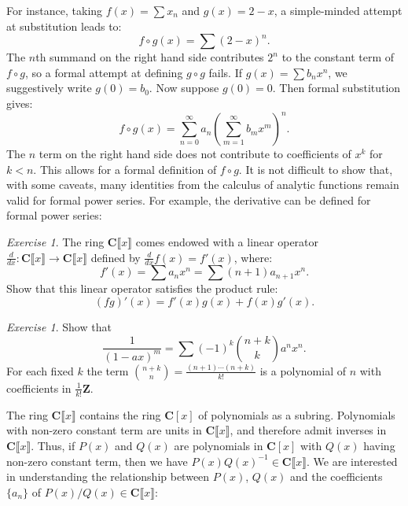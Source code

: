\documentclass{amsbook}
\newcommand{\ZZ}{\mathbf Z}
\newcommand{\CC}{\mathbf C}
\newcommand{\ps}[1]{\CC\llbracket#1\rrbracket}
\theoremstyle{definition}
\theoremstyle{remark}
\newtheorem{exercise}[theorem]{Exercise}
\begin{document}
For instance, taking $f(x)=\sum x_n$ and $g(x)=2-x$, a simple-minded attempt at substitution leads to:
\begin{displaymath}
  f\circ g(x) = \sum  (2-x)^n.
\end{displaymath}
The $n$th summand on the right hand side contributes $2^n$ to the constant term of $f\circ g$, so a formal attempt at defining $g\circ g$ fails.
If $g(x)=\sum b_nx^n$, we suggestively write $g(0)=b_0$.
Now suppose $g(0)=0$.
Then formal substitution gives:
\begin{displaymath}
  f\circ g(x) = \sum_{n=0}^\infty a_n\left(\sum_{m=1}^\infty b_mx^m\right)^n.
\end{displaymath}
The $n$ term on the right hand side does not contribute to coefficients of $x^k$ for $k<n$.
This allows for a formal definition of $f\circ g$.
It is not difficult to show that, with some caveats, many identities from the calculus of analytic functions remain valid for formal power series. For example, the derivative can be defined for formal power series:
\begin{exercise}
  The ring $\ps x$ comes endowed with a linear operator $\frac d{dx}:\ps x\to \ps x$ defined by $\frac d{dx}f(x) = f'(x)$, where:
  \begin{displaymath}
    f'(x)=\sum a_n x^n = \sum (n+1)a_{n+1}x^n.
  \end{displaymath}
  Show that this linear operator satisfies the product rule:
  \begin{displaymath}
    (fg)'(x) = f'(x)g(x)+f(x)g'(x).
  \end{displaymath}
\end{exercise}
\begin{exercise}
  \label{ex:geom-diff}
  Show that
  \begin{displaymath}
    \frac 1{(1-ax)^{m}} = \sum (-1)^k\binom{n+k}k a^n x^n.
  \end{displaymath}
  For each fixed $k$ the term $\binom{n+k}n=\frac{(n+1)\dotsb(n+k)}{k!}$ is a polynomial of $n$ with coefficients in $\frac 1{k!}\ZZ$.
\end{exercise}
The ring $\ps x$ contains the ring $\CC[x]$ of polynomials as a subring.
Polynomials with non-zero constant term are units in $\ps x$, and therefore admit inverses in $\ps x$.
Thus, if $P(x)$ and $Q(x)$ are polynomials in $\CC[x]$ with $Q(x)$ having non-zero constant term, then  we have $P(x)Q(x)^{-1}\in \ps x$.
We are interested in understanding the relationship between $P(x)$, $Q(x)$ and the coefficients $\{a_n\}$ of $P(x)/Q(x) \in \ps x$:
\end{document}
